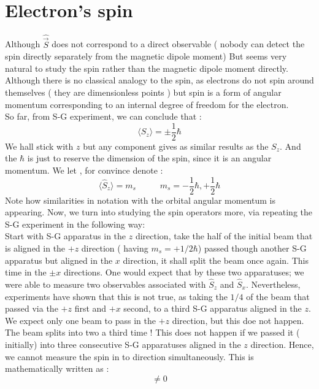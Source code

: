 \section{ Electron's spin}
Although $ \hat \vec S$ does not correspond to a direct observable ( nobody can detect the spin directly separately from the magnetic dipole moment) But seems very natural to study the spin rather than the magnetic dipole moment directly. Although there is no classical analogy to the spin, as electrons do not spin around themselves ( they are dimensionless points ) but spin is a form of angular momentum corresponding to an internal degree of freedom for the electron.\\
So far, from S-G experiment,  we can conclude that :
\begin{equation}
\langle \hat S_z \rangle = \pm \frac{1}{2} \hbar 
\end{equation}
We hall stick with $z$ but any component gives as similar results as the $ S_z$. And the $\hbar$ is just to reserve the dimension of the spin, since it is an angular momentum. We let , for convince denote :
\begin{equation}
\langle \hat S_z \rangle = m_s \; \; \; \;  \; \; \; \; \;\; m_s = -\frac{1}{2} \hbar , +\frac{1}{2} \hbar 
\end{equation} 
 Note how similarities in notation with the orbital angular momentum is appearing. Now, we turn into studying the spin operators more, via repeating the S-G experiment in the following way:\\
Start with S-G apparatus in the $z$ direction, take the half of the initial beam that is aligned in the $+z$ direction ( having $m_s = +1/2 \hbar$) passed though another S-G apparatus but aligned in the $x$ direction, it shall split the beam once again. This time in the $\pm x$ directions. One would expect that by these two apparatuses; we were able to measure two observables associated with $ \hat S_z$ and  $\hat S_x$. Nevertheless, experiments have shown that this is not true, as taking the $1/4$ of the beam that passed via the $+z$ first and $+x$ second, to a third S-G apparatus aligned in the $z$. We expect only one beam to pass in the $+z$ direction, but this doe not happen. The beam splits into two a third time ! This does not happen if we passed it ( initially) into three consecutive S-G apparatuses aligned in the $z$ direction. Hence, we cannot measure the spin in to direction simultaneously. This is mathematically written as   :
\begin{equation}
[ \hat S_z,\hat S_x] \neq 0
\end{equation}
